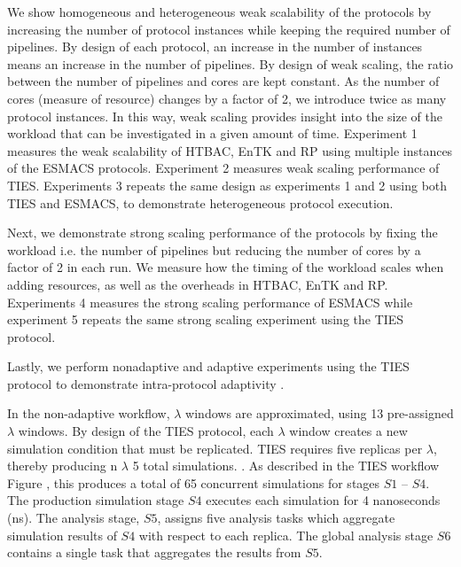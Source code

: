     We show homogeneous and heterogeneous weak scalability of the protocols by
increasing the number of protocol instances while keeping the required number
of pipelines. By design of each protocol, an increase in the number of
instances means an increase in the number of pipelines.  By design of weak 
scaling, the ratio between the number of pipelines and cores are kept constant. 
As the number of cores (measure of resource) changes by a factor of 2, we 
introduce twice as many protocol instances. In this way, weak scaling provides 
insight into the size of the workload that can be investigated in a given amount 
of time.
    Experiment 1 measures the weak scalability of HTBAC, EnTK and RP using 
multiple instances of the ESMACS protocols. Experiment 2 measures weak scaling 
performance of TIES. Experiments 3 repeats the same design as experiments 1 and 
2 using both TIES and ESMACS, to demonstrate heterogeneous protocol execution. 

    Next, we demonstrate strong scaling performance of the protocols by fixing 
the workload i.e. the number of pipelines but reducing the number of cores 
by a factor of 2 in each run. We measure how the timing of the workload scales 
when adding resources,  as well as the overheads in HTBAC, EnTK and RP. Experiments 4 
measures the strong scaling performance of ESMACS while experiment 5 repeats the 
same strong scaling experiment using the TIES protocol. 

    Lastly, we perform nonadaptive and adaptive experiments using the TIES 
protocol to demonstrate intra-protocol adaptivity . 

In the non-adaptive workflow, $\lambda$ windows are approximated, using 13 
pre-assigned $\lambda$ windows.  By design of the TIES protocol, each $\lambda$ window creates a new simulation condition that must be 
replicated. TIES requires five replicas per $\lambda$, thereby producing
n $\lambda$  5 total simulations. . As described in the TIES workflow 
Figure , this produces a total of 65 concurrent simulations for stages $S1$ -- $S4$. The production simulation stage 
$S4$ executes each simulation for 4 nanoseconds (ns). The analysis stage, $S5$, 
assigns five analysis tasks which aggregate simulation results of $S4$ with 
respect to each replica. The global analysis stage $S6$ contains a single task
that aggregates the results from $S5$.  


